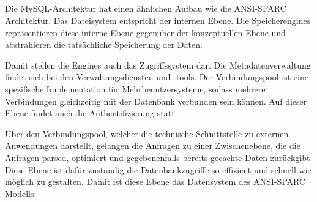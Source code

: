 \documentclass[ngerman]{gdb-aufgabenblatt}
\begin{document}
	\subsection{} %
		Die MySQL-Architektur hat einen ähnlichen Aufbau wie die ANSI-SPARC Architektur. Das Dateisystem entspricht der internen Ebene. Die Speicherengines repräsentieren diese interne Ebene gegenüber der konzeptuellen Ebene und abstrahieren die tatsächliche Speicherung der Daten. 
		
		Damit stellen die Engines auch das Zugriffssystem dar. Die Metadatenverwaltung findet sich bei den Verwaltungsdiensten und -tools. Der Verbindungspool ist eine spezifische Implementation für Mehrbenutzersysteme, sodass mehrere Verbindungen gleichzeitig mit der Datenbank verbunden sein können. Auf dieser Ebene findet auch die Authentifizierung statt.
		
		Über den Verbindungspool, welcher die technische Schnittstelle zu externen Anwendungen darstellt, gelangen die Anfragen zu einer Zwischenebene, die die Anfragen parsed, optimiert und gegebenenfalls bereits gecachte Daten zurückgibt. Diese Ebene ist dafür zuständig die Datenbankzugriffe so effizient und schnell wie möglich zu gestalten. Damit ist diese Ebene das Datensystem des ANSI-SPARC Modells.
\end{document}
